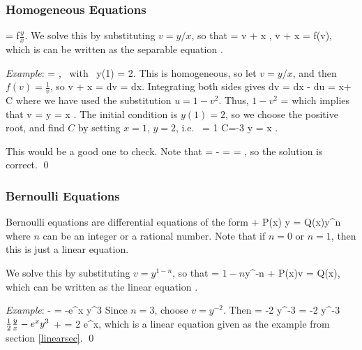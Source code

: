 \documentclass[12pt]{article}
\begin{document}
\subsubsection{Homogeneous Equations}
\be 
{} = f\(\frac{y}{x}\).
\ee
We solve this by substituting $v=y/x$, so that
\be 
{} = v + x ,
\quad \implies \quad
v + x  = f(v),
\ee
which is can be written as the separable equation
\be
{}.
\ee

\noindent \emph{Example}:
\be 
{} = , \mbox{ with } y(1) = 2.
\ee
This is homogeneous, so let $v=y/x$, and then $f(v) = \frac{1}{v}$, so
\be 
v + x  =  
\quad \implies \quad
{} dv = dx.
\ee
Integrating both sides gives
\be 
\int {}dv = \int {} dx
\quad \implies \quad
- \int {}du = \ln x+ \ln C
\ee
where we have used the substitution $u = 1-v^2$. Thus,
\be 
\ln\(1-v^2 \) = \ln {}
\ee
which implies that 
\be 
v = \pm {} 
\quad \implies \quad 
y = \pm x .
\ee
The initial condition is $y(1)=2$, so we choose the positive root, and
find $C$ by setting $x=1$, $y=2$, i.e.\
 = 1 \times {} 
\quad \implies \quad 
C=-3
\quad \implies \quad 
y = x .
\ee

This would be a good one to check. Note that 
\be 
{} =  - 
= \frac{1}{\sqrt{1+\frac{3}{x^2}}}
= , 
\ee
so the solution is correct. \qed

\subsubsection{Bernoulli Equations}
Bernoulli equations are differential equations of the form
\be 
{} + P(x) y = Q(x)y^n
\ee
where $n$ can be an integer or a rational number. Note that if
$n=0$ or $n=1$, then this is just a linear equation.

We solve this by substituting $v=y^{1-n}$, so that
\be 
{} = \(1-n\)y^{-n}
\quad \implies \quad
{}  + P(x)v = Q(x),
\ee
which can be written as the linear equation
\be
{}.
\ee

\noindent\emph{Example}:
\be 
{} -\half {} = -e^x y^3
\ee
Since $n=3$, choose $v=y^{-2}$. Then
\be 
{} = -2 y^{-3}  
\quad \implies \quad
{} = -2 y^{-3}\( \half \frac{y}{x}  - e^x y^3\)
\quad \implies \quad
{} +  = 2 e^x,
\ee
which is a linear equation given as the example from section \ref{linearsec}. 
\qed
\end{document}

